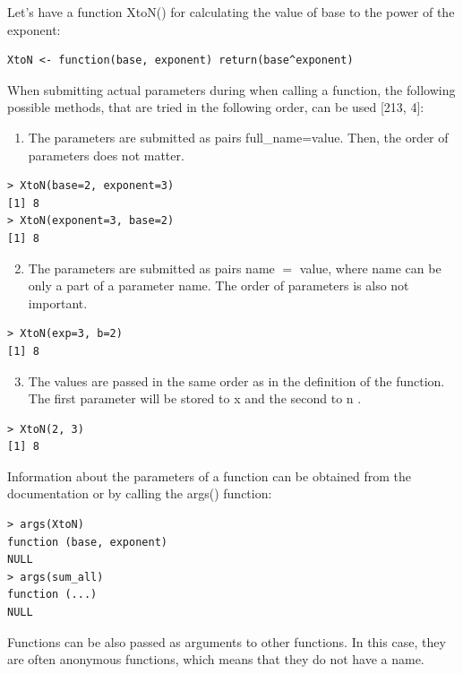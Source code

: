 \documentclass[10pt]{book}
\begin{document}
Let's have a function XtoN() for calculating the value of base to the power of the exponent:

\begin{verbatim}
XtoN <- function(base, exponent) return(base^exponent)
\end{verbatim}

When submitting actual parameters during when calling a function, the following possible methods, that are tried in the following order, can be used [213, 4]:

\begin{enumerate}
  \item The parameters are submitted as pairs full\_name=value. Then, the order of parameters does not matter.
\end{enumerate}

\begin{verbatim}
> XtoN(base=2, exponent=3)
[1] 8
> XtoN(exponent=3, base=2)
[1] 8
\end{verbatim}

\begin{enumerate}
  \setcounter{enumi}{1}
  \item The parameters are submitted as pairs name $=$ value, where name can be only a part of a parameter name. The order of parameters is also not important.
\end{enumerate}

\begin{verbatim}
> XtoN(exp=3, b=2)
[1] 8
\end{verbatim}

\begin{enumerate}
  \setcounter{enumi}{2}
  \item The values are passed in the same order as in the definition of the function. The first parameter will be stored to x and the second to n .
\end{enumerate}

\begin{verbatim}
> XtoN(2, 3)
[1] 8
\end{verbatim}

Information about the parameters of a function can be obtained from the documentation or by calling the args() function:

\begin{verbatim}
> args(XtoN)
function (base, exponent)
NULL
> args(sum_all)
function (...)
NULL
\end{verbatim}

Functions can be also passed as arguments to other functions. In this case, they are often anonymous functions, which means that they do not have a name.
\end{document}
